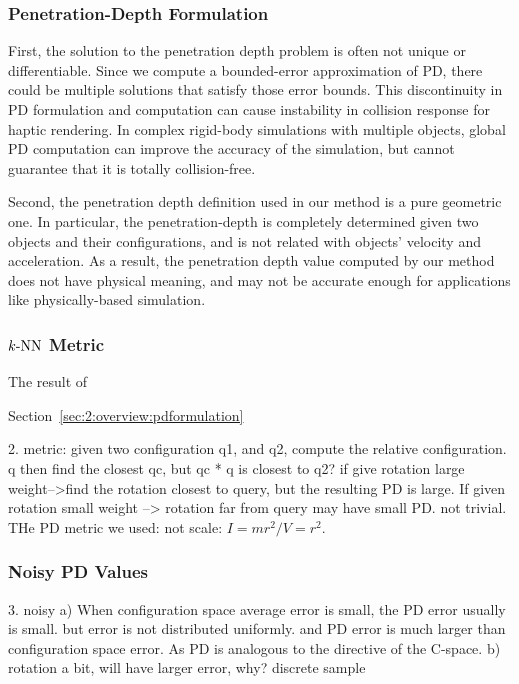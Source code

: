 \subsubsection{Penetration-Depth Formulation}

First, the solution to the penetration depth problem is often not unique or differentiable. Since we compute
a bounded-error approximation of PD, there could be multiple solutions that satisfy those error bounds.
This discontinuity in PD formulation and computation can cause instability in collision response for haptic rendering. In complex rigid-body simulations with multiple objects, global PD computation can improve the accuracy of the simulation, but cannot guarantee that it is totally collision-free.

Second, the penetration depth definition used in our method is a pure geometric one. In particular, the penetration-depth is completely determined given two objects and their configurations, and is not related with objects' velocity and acceleration. As a result, the penetration depth value computed by our method does not have physical meaning, and may not be accurate enough for applications like physically-based simulation.

\subsubsection{$k\text{-NN}$ Metric}
The result of 

Section~\ref{sec:2:overview:pdformulation}

2. metric: given two configuration q1, and q2, compute the relative configuration. q then find the closest qc, but qc * q is closest to q2? if give rotation large weight-->find the rotation closest to query, but the resulting PD is large. If given rotation small weight --> rotation far from query may have small PD.   not trivial. THe PD metric we used: not scale: $I = mr^2 / V = r^2$.


\subsubsection{Noisy PD Values}








3. noisy a) When configuration space average error is small, the PD error usually is small. but error is not distributed uniformly. and PD error is much larger than configuration space error. As PD is analogous to the directive of the C-space.   b) rotation a bit, will have larger error, why? discrete sample

